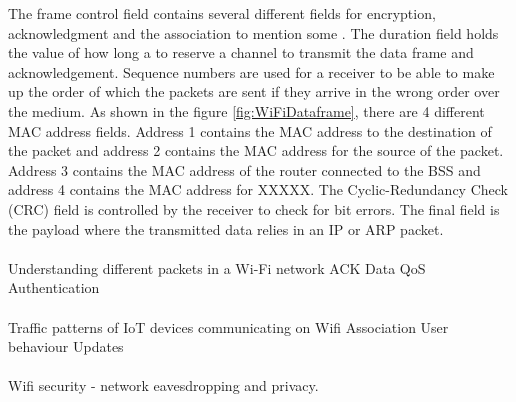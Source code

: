 The frame control field contains several different fields for encryption, acknowledgment and the association to mention some \cite{Datacom}. The duration field holds the value of how long a to reserve a channel to transmit the data frame and acknowledgement. Sequence numbers are used for a receiver to be able to make up the order of which the packets are sent if they arrive in the wrong order over the medium. As shown in the figure \ref{fig:WiFiDataframe}, there are 4 different MAC address fields. Address 1 contains the MAC address to the destination of the packet and address 2 contains the MAC address for the source of the packet. Address 3 contains the MAC address of the router connected to the BSS and address 4 contains the MAC address for XXXXX. The Cyclic-Redundancy Check (CRC) field is controlled by the receiver to check for bit errors. The final field is the payload where the transmitted data relies in an IP or ARP packet. 
\\\\
Understanding different packets in a Wi-Fi network
ACK
    Data
    QoS
    Authentication
\\\\
Traffic patterns of IoT devices communicating on Wifi
    Association
    User behaviour
    Updates
\\\\
Wifi security - network eavesdropping and privacy.